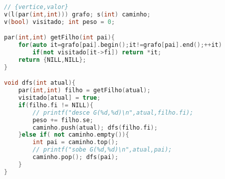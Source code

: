 \begin{lstlisting}[language=C++,title=lista de adjacêncica]
// {vertice,valor}
v(l(par(int,int))) grafo; s(int) caminho;
v(bool) visitado; int peso = 0;

par(int,int) getFilho(int pai){
    for(auto it=grafo[pai].begin();it!=grafo[pai].end();++it)
        if(not visitado[it->fi]) return *it;
    return {NILL,NILL};
}

void dfs(int atual){
    par(int,int) filho = getFilho(atual);
    visitado[atual] = true;
    if(filho.fi != NILL){
        // printf("desce G(%d,%d)\n",atual,filho.fi);
        peso += filho.se;
        caminho.push(atual); dfs(filho.fi);
    }else if( not caminho.empty()){
        int pai = caminho.top();
        // printf("sobe G(%d,%d)\n",atual,pai);
        caminho.pop(); dfs(pai);
    }
}
\end{lstlisting}
